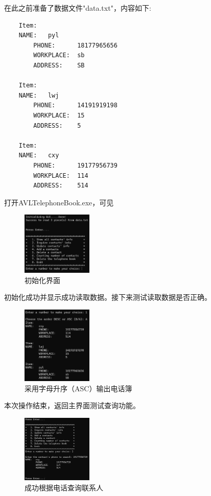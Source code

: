 \documentclass[12pt, a4paper, oneside]{ctexart}
\begin{document}
在此之前准备了数据文件"data.txt"，内容如下:

\begin{framed}
\begin{lstlisting}
    Item:
    NAME:	pyl
        PHONE:		18177965656
        WORKPLACE:	sb
        ADDRESS:	SB
    
    Item:
    NAME:	lwj
        PHONE:		14191919198
        WORKPLACE:	15
        ADDRESS:	5
    
    Item:
    NAME:	cxy
        PHONE:		19177956739
        WORKPLACE:	114
        ADDRESS:	514
\end{lstlisting}
\end{framed}

打开AVLTelephoneBook.exe，可见

\begin{figure}[!h]
  \centering
  \includegraphics[width=0.3\textwidth]{graphic/01.png}
  \caption{初始化界面}
  \label{}
\end{figure}
初始化成功并显示成功读取数据。接下来测试读取数据是否正确。
\begin{figure}[!h]
  \centering
  \includegraphics[width=0.3\textwidth]{graphic/02.png}
  \caption{采用字母升序（ASC）输出电话簿}
  \label{}
\end{figure}

本次操作结束，返回主界面测试查询功能。\newpage

\begin{figure}[!h]
  \centering
  \includegraphics[width=0.3\textwidth]{graphic/03}
  \caption{成功根据电话查询联系人}
  \label{}
\end{figure}
\end{document}
